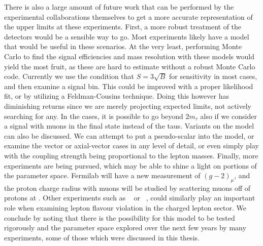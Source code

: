 There is also a large amount of future work that can be performed by the experimental collaborations themselves to get a more accurate representation of the upper limits at these experiments.
First, a more robust treatment of the detectors would be a sensible way to go.
Most experiments likely have a \geant model that would be useful in these scenarios.
At the very least, performing Monte Carlo to find the signal efficiencies and mass resolution with these models would yield the most fruit, as these are hard to estimate without a robust Monte Carlo code.
Currently we use the condition that $S = 3\sqrt{B}$ for sensitivity in most cases, and then examine a signal bin.
This could be improved with a proper likelihood fit, or by utilizing a Feldman-Cousins technique.
Doing this however has diminishing returns since we are merely projecting expected limits, not actively searching for any.
In the \belletwo cases, it is possible to go beyond $2m_\tau$ also if we consider a signal with muons in the final state instead of the taus.
Variants on the model can also be discussed.
We can attempt to put a pseudo-scalar into the model, or examine the vector or axial-vector cases in any level of detail, or even simply play with the coupling strength being proportional to the lepton masses.
Finally, more experiments are being pursued, which may be able to shine a light on portions of the parameter space.
Fermilab will have a new measurement of $(g-2)_\mu$, and the proton charge radius with muons will be studied by scattering muons off of protons at \muse.
Other experiments such as \mutoe~\cite{Abrams:2012er} or \comet~\cite{Cui:2009zz}, could similarly play an important role when examining lepton flavour violation in the charged lepton sector.
We conclude by noting that there is the possibility for this model to be tested rigorously and the parameter space explored over the next few years by many experiments, some of those which were discussed in this thesis.
